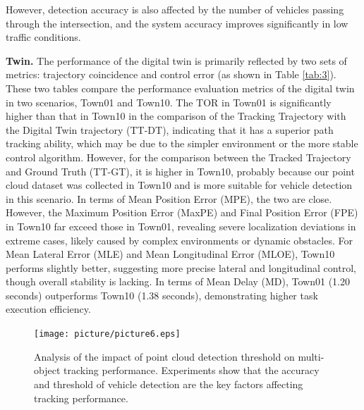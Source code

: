 \documentclass[journal,twoside,web]{ieeecolor}
\begin{document}
However, detection accuracy is also affected by the number of vehicles passing through the intersection, and the system accuracy improves significantly in low traffic conditions.

\textbf{Twin.}
The performance of the digital twin is primarily reflected by two sets of metrics: trajectory coincidence and control error (as shown in Table \ref{tab:3}). 
These two tables compare the performance evaluation metrics of the digital twin in two scenarios, Town01 and Town10. 
The TOR in Town01 is significantly higher than that in Town10 in the comparison of the Tracking Trajectory with the Digital Twin trajectory (TT-DT), indicating that it has a superior path tracking ability, which may be due to the simpler environment or the more stable control algorithm.
However, for the comparison between the Tracked Trajectory and Ground Truth (TT-GT), it is higher in Town10, probably because our point cloud dataset was collected in Town10 and is more suitable for vehicle detection in this scenario.
In terms of Mean Position Error (MPE), the two are close. 
However, the Maximum Position Error (MaxPE) and Final Position Error (FPE) in Town10 far exceed those in Town01, revealing severe localization deviations in extreme cases, likely caused by complex environments or dynamic obstacles. 
For Mean Lateral Error (MLE) and Mean Longitudinal Error (MLOE), Town10 performs slightly better, suggesting more precise lateral and longitudinal control, though overall stability is lacking. 
In terms of Mean Delay (MD), Town01 (1.20 seconds) outperforms Town10 (1.38 seconds), demonstrating higher task execution efficiency.

\begin{figure}[!t]
	\centering
	\centerline{\texttt{[image: picture/picture6.eps]}}
	\caption{Analysis of the impact of point cloud detection threshold on multi-object tracking performance. Experiments show that the accuracy and threshold of vehicle detection are the key factors affecting tracking performance.} 
	\label{fig:6} 
\end{figure}
\end{document}
